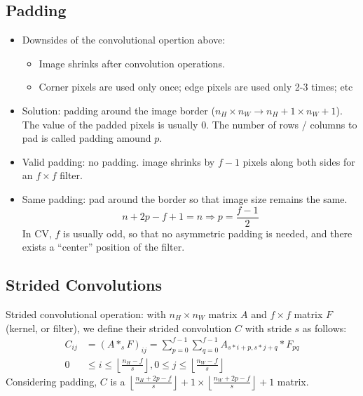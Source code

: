 \subsection{Padding}
\begin{itemize}
  \item Downsides of the convolutional opertion above:
  \begin{itemize}
    \item Image shrinks after convolution operations.
    \item Corner pixels are used only once; edge pixels are used only 2-3 times; etc
  \end{itemize} 
  \item Solution: padding around the image border ($n_H\times n_W\rightarrow n_H+1\times n_W+1$). The value of the padded pixels is usually 0. The number of rows / columns to pad is called padding amound $p$.
  \item Valid padding: no padding. image shrinks by $f-1$ pixels along both sides for an $f\times f$ filter. 
  \item Same padding: pad around the border so that image size remains the same.
  \[n+2p-f+1=n\Rightarrow p=\frac{f-1}{2}\]
  In CV, $f$ is usually odd, so that no asymmetric padding is needed, and there exists a ``center'' position of the filter.
\end{itemize}
\subsection{Strided Convolutions}
Strided convolutional operation: with $n_H\times n_W$ matrix $A$ and $f\times f$ matrix $F$ (kernel, or filter), we define their strided convolution $C$ with stride $s$ as follows:
\begin{align*}
  C_{ij}&=\left(A*_sF\right)_{ij}=\displaystyle\sum_{p=0}^{f-1}\displaystyle\sum_{q=0}^{f-1}A_{s*i+p,s*j+q}*F_{pq}\\
  0&\le i\le \left\lfloor\frac{n_H-f}{s}\right\rfloor, 0\le j\le \left\lfloor\frac{n_W-f}{s}\right\rfloor
\end{align*}
Considering padding, $C$ is a $\left\lfloor\frac{n_H+2p-f}{s}\right\rfloor+1\times\left\lfloor\frac{n_W+2p-f}{s}\right\rfloor+1$ matrix.
